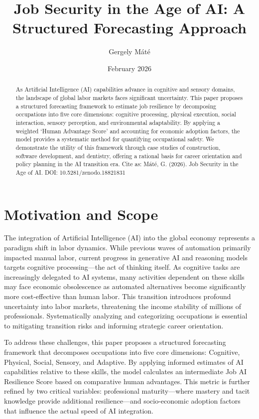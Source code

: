\documentclass[
  11pt,
]{article}
\title{Job Security in the Age of AI: A Structured Forecasting Approach}
\author{Gergely Máté \orcidlink{0009-0003-6124-5415}}
\date{February 2026}
\begin{document}
\maketitle
\begin{abstract}
As Artificial Intelligence (AI) capabilities advance in cognitive and
sensory domains, the landscape of global labor markets faces significant
uncertainty. This paper proposes a structured forecasting framework to
estimate job resilience by decomposing occupations into five core
dimensions: cognitive processing, physical execution, social
interaction, sensory perception, and environmental adaptability. By
applying a weighted `Human Advantage Score' and accounting for economic
adoption factors, the model provides a systematic method for quantifying
occupational safety. We demonstrate the utility of this framework
through case studies of construction, software development, and
dentistry, offering a rational basis for career orientation and policy
planning in the AI transition era. \vfill \hfill \tiny Cite as: Máté, G.
(2026). Job Security in the Age of AI. DOI: 10.5281/zenodo.18821831
\end{abstract}

\section{Motivation and Scope}\label{motivation-and-scope}

The integration of Artificial Intelligence (AI) into the global economy
represents a paradigm shift in labor dynamics. While previous waves of
automation primarily impacted manual labor, current progress in
generative AI and reasoning models targets cognitive processing---the
act of thinking itself. As cognitive tasks are increasingly delegated to
AI systems, many activities dependent on these skills may face economic
obsolescence as automated alternatives become significantly more
cost-effective than human labor. This transition introduces profound
uncertainty into labor markets, threatening the income stability of
millions of professionals. Systematically analyzing and categorizing
occupations is essential to mitigating transition risks and informing
strategic career orientation.

To address these challenges, this paper proposes a structured
forecasting framework that decomposes occupations into five core
dimensions: Cognitive, Physical, Social, Sensory, and Adaptive. By
applying informed estimates of AI capabilities relative to these skills,
the model calculates an intermediate Job AI Resilience Score based on
comparative human advantages. This metric is further refined by two
critical variables: professional maturity---where mastery and tacit
knowledge provide additional resilience---and socio-economic adoption
factors that influence the actual speed of AI integration.
\end{document}
